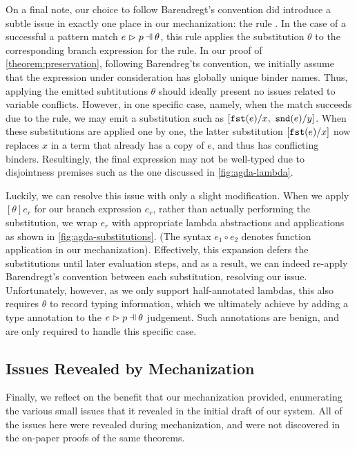 On a final note, our choice to follow Barendregt's convention did introduce a subtle issue in exactly one place in our mechanization: the rule \ITSuccMatch. In the case of a successful a pattern match $\hpatmatch{e}{p}{\theta}$, this rule applies the substitution $\theta$ to the corresponding branch expression for the rule. In our proof of \autoref{theorem:preservation}, following Barendreg'ts convention, we initially assume that the expression under consideration has globally unique binder names. Thus, applying the emitted subtitutions $\theta$ should ideally present no issues related to variable conflicts. However, in one specific case, namely, when the match succeeds due to the \MNotIntroPair rule, we may emit a substitution such as $[\mathtt{fst}(e) / x,~ \mathtt{snd}(e) / y]$. When these substitutions are applied one by one, the latter substitution $[\mathtt{fst}(e) / x]$ now replaces $x$ in a term that already has a copy of $e$, and thus has conflicting binders. Resultingly, the final expression may not be well-typed due to disjointness premises such as the one discussed in \autoref{fig:agda-lambda}.



Luckily, we can resolve this issue with only a slight modification. When we apply $[\theta]e_r$ for our branch expression $e_r$, rather than actually performing the substitution, we wrap $e_r$ with appropriate lambda abstractions and applications as shown in \autoref{fig:agda-substitutions}. (The syntax $e_1 \circ e_2$ denotes function application in our mechanization). Effectively, this expansion defers the substitutions until later evaluation steps, and as a result, we can indeed re-apply Barendregt's convention between each substitution, resolving our issue. Unfortunately, however, as we only support half-annotated lambdas, this also requires $\theta$ to record typing information, which we ultimately achieve by adding a type annotation to the $\hpatmatch{e}{p}{\theta}$ judgement. Such annotations are benign, and are only required to handle this specific case.

\subsection{Issues Revealed by Mechanization}\label{sec:errors}
Finally, we reflect on the benefit that our mechanization provided, enumerating the various small issues that it revealed in the initial draft of our system. All of the issues here were revealed during mechanization, and were not discovered in the on-paper proofs of the same theorems.

